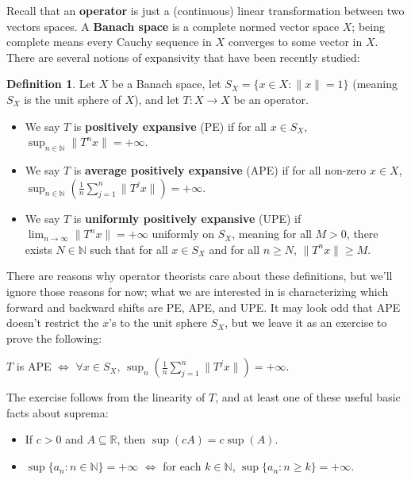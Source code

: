 \documentclass{article}
\theoremstyle{definition}\newtheorem{remark}[theorem]{Remark}
\theoremstyle{definition}\newtheorem{example}[theorem]{Example}
\theoremstyle{definition}\newtheorem{fact}[theorem]{Fact}
\theoremstyle{definition}\newtheorem{diagram}[theorem]{Diagram}
\theoremstyle{definition}\newtheorem{definition}[theorem]{Definition}
\theoremstyle{definition}\newtheorem{question}[theorem]{Question}
\newcommand{\R}{\mathbb{R}}
\newcommand{\N}{\mathbb{N}}
\begin{document}

\large

Recall that an \textbf{operator} is just a (continuous) linear transformation between two vectors spaces. A \textbf{Banach space} is a complete normed vector space $X$; being complete means every Cauchy sequence in $X$ converges to some vector in $X$. There are several notions of expansivity that have been recently studied:

\begin{definition}
    Let $X$ be a Banach space, let $S_X=\{x\in X: \|x\|=1\}$ (meaning $S_X$ is the unit sphere of $X$), and let $T:X\to X$ be an operator.
    \begin{itemize}
        \item We say $T$ is \textbf{positively expansive} (PE) if for all $x\in S_X$, $\sup_{n\in \N} \|T^n x\|=+\infty$.
        \item \sloppy We say $T$ is \textbf{average positively expansive} (APE) if for all non-zero $x\in X$, $\sup_{n\in \N} \left(\frac {1}{n} \sum_{j=1}^n \|T^j x\|\right)=+\infty$.
        \item We say $T$ is \textbf{uniformly positively expansive} (UPE) if $\lim_{n\to \infty} \|T^n x\|=+\infty$ uniformly on $S_X$, meaning for all $M>0$, there exists $N\in \N$ such that for all $x\in S_X$ and for all $n\geq N$, $\|T^n x\|\geq M$.
    \end{itemize}
\end{definition}

There are reasons why operator theorists care about these definitions, but we'll ignore those reasons for now; what we are interested in is characterizing which forward and backward shifts are PE, APE, and UPE. It may look odd that APE doesn't restrict the $x$'s to the unit sphere $S_X$, but we leave it as an exercise to prove the following:
\begin{center}
    $T$ is APE $\iff$ $\forall x\in S_X$, $\sup_n \left(\frac {1}{n} \sum_{j=1}^n \|T^j x\|\right)=+\infty$.
\end{center}
The exercise follows from the linearity of $T$, and at least one of these useful basic facts about suprema:
\begin{itemize}
    \item If $c>0$ and $A\subseteq \R$, then $\sup (cA)=c\sup (A)$.
    \item $\sup\{a_n: n\in \N\}=+\infty$ $\iff$ for each $k\in \N$, $\sup\{a_n: n\geq k\}=+\infty$.
\end{itemize}
\end{document}
